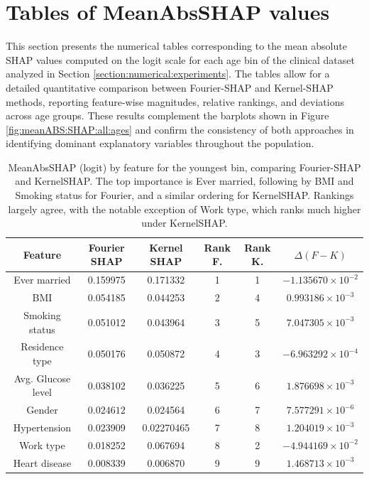 \documentclass[letterpaper,11pt]{article}
\numberwithin{equation}{section}
\numberwithin{equation}{section}
\begin{document}

\section{Tables of MeanAbsSHAP values}
\label{Appendix:tables}

This section presents the numerical tables corresponding to the mean absolute SHAP values computed on the logit scale for each age bin of the clinical dataset analyzed in Section \ref{section:numerical:experiments}. The tables allow for a detailed quantitative comparison between Fourier-SHAP and Kernel-SHAP methods, reporting feature-wise magnitudes, relative rankings, and deviations across age groups. These results complement the barplots shown in Figure \ref{fig:meanABS:SHAP:all:ages} and confirm the consistency of both approaches in identifying dominant explanatory variables throughout the population.

\begin{table}[H]
    \centering
    \begin{tabular}{|c||c|c|c|c|c|} \hline 
         Feature & Fourier SHAP & Kernel SHAP & Rank F. & Rank K. & $\Delta (F-K) $ \\ \hline \hline 
         Ever married & 0.159975 & 0.171332 & 1 & 1 & $-1.135670\times 10^{-2}$ \\ \hline 
         BMI & 0.054185 & 0.044253 & 2 & 4 & $0.993186\times 10^{-3}$ \\ \hline 
         Smoking status & 0.051012 & 0.043964 & 3 & 5 & $7.047305 \times 10^{-3}$  \\ \hline 
         Residence type & 0.050176 & 0.050872 & 4 & 3 & $-6.963292\times 10^{-4}$ \\ \hline 
         Avg. Glucose level & 0.038102 & 0.036225 & 5 & 6 & $1.876698 \times 10^{-3}$\\ \hline 
         Gender & $0.024612$ & 0.024564 & 6 & 7 & $7.577291 \times 10^{-6}$ \\ \hline 
         Hypertension & 0.023909 & 0.02270465 & 7 & 8 & $1.204019 \times 10^{-3}$ \\ \hline 
         Work type & 0.018252 & 0.067694 & 8 & 2 & $-4.944169\times 10^{-2}$ \\ \hline
         Heart disease & 0.008339 & 0.006870 & 9 & 9 & $1.468713 \times 10^{-3}$\\ \hline
    \end{tabular}
    \caption{MeanAbsSHAP (logit) by feature for the youngest bin, comparing Fourier-SHAP and KernelSHAP. The top importance is Ever married, following by BMI and Smoking status for Fourier, and a similar ordering for KernelSHAP. Rankings largely agree, with the notable exception of Work type, which ranks much higher under KernelSHAP.}
\end{table}
\end{document}
